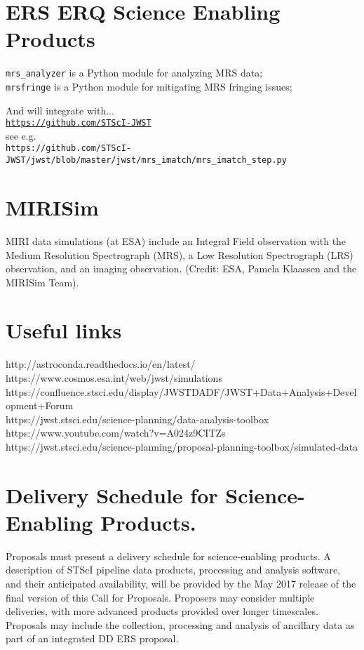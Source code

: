\section*{ERS ERQ Science Enabling Products}
{\tt mrs\_analyzer} is  a Python module for analyzing MRS data; \\
{\tt mrsfringe} is a Python module for mitigating MRS fringing issues; \

\smallskip \smallskip
\noindent
And will integrate with...\\
\href{https://github.com/STScI-JWST}{\tt https://github.com/STScI-JWST} \\
see e.g. \\
{\tt https://github.com/STScI-JWST/jwst/blob/master/jwst/mrs\_imatch/mrs\_imatch\_step.py}\\


\section*{MIRISim}
MIRI data simulations (at ESA) include an Integral Field observation
with the Medium Resolution Spectrograph (MRS), a Low Resolution
Spectrograph (LRS) observation, and an imaging observation. (Credit:
ESA, Pamela Klaassen and the MIRISim Team).

\section{Useful links}
http://astroconda.readthedocs.io/en/latest/ \\
https://www.cosmos.esa.int/web/jwst/simulations\\
https://confluence.stsci.edu/display/JWSTDADF/JWST+Data+Analysis+Development+Forum\\
https://jwst.stsci.edu/science-planning/data-analysis-toolbox\\
https://www.youtube.com/watch?v=A024z9CITZs\\
https://jwst.stsci.edu/science-planning/proposal-planning-toolbox/simulated-data\\


\section*{Delivery Schedule for Science-Enabling Products.} 
Proposals must present a delivery schedule for science-enabling products. A description of STScI pipeline data products, processing and analysis software, and their anticipated availability, will be provided by the May 2017 release of the final version of this Call for Proposals.  Proposers may consider multiple deliveries, with more advanced products provided over longer timescales. Proposals may include the collection, processing and analysis of ancillary data as part of an integrated DD ERS proposal.


